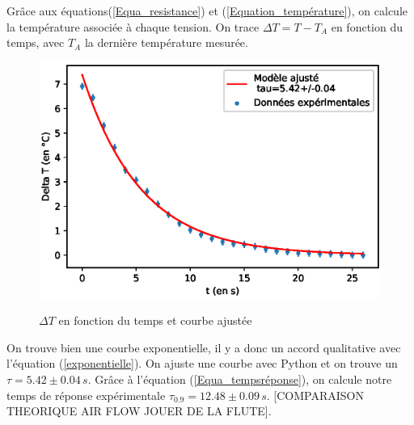 \documentclass[12pt]{article}
\begin{document}
\newpage
Grâce aux équations(\ref{Equa_resistance}) et (\ref{Equation_température}), on calcule la température associée à chaque tension. On trace $\Delta T=T-T_A$ en fonction du temps, avec $T_A$ la dernière température mesurée.

\begin{figure}[h!]
	\begin{center}
		\includegraphics[scale=0.7]{Tempscara.eps}
		\label{Temps_caractéristique}
		\caption{$\Delta T$ en fonction du temps et courbe ajustée}
	\end{center}
\end{figure}

On trouve bien une courbe exponentielle, il y a donc un accord qualitative avec l'équation (\ref{exponentielle}). On ajuste une courbe avec Python et on trouve un $\tau = 5.42\pm 0.04\,s$. Grâce à l'équation (\ref{Equa_tempsréponse}), on calcule notre temps de réponse expérimentale $\tau_{0.9}=12.48\pm 0.09\,s$. [COMPARAISON THEORIQUE AIR FLOW JOUER DE LA FLUTE].
\end{document}
